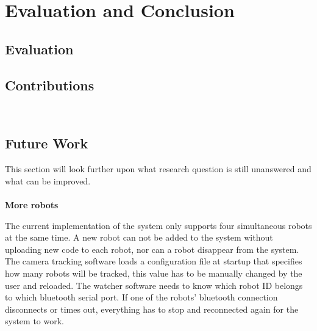 \chapter{Evaluation and Conclusion}
\label{cha:evaluationAndConclusion}




\section{Evaluation}
\label{sec:Evaluation}





\section{Contributions}~\label{cont}
\label{sec:Contributions}



\section{Future Work}
\label{sec:futureWork}

This section will look further upon what research question is still unanswered and what can be improved.\\\\
\textbf{More robots}

The current implementation of the system only supports four simultaneous robots at the same time. A new robot can not be added to the system without uploading new code to each robot, nor can a robot disappear from the system. The camera tracking software loads a configuration file at startup that specifies how many robots will be tracked, this value has to be manually changed by the user and reloaded.
The watcher software needs to know which robot ID belongs to which bluetooth serial port. If one of the robots' bluetooth connection disconnects or times out, everything has to stop and reconnected again for the system to work.

